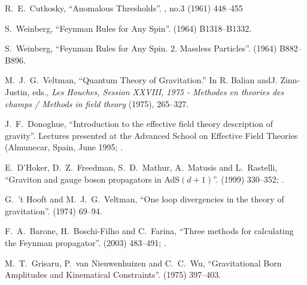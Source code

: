 \begin{thebibliography}{99}
R.~E.~Cutkosky,
``Anomalous Thresholds''.
 , no.3 (1961) 448--455\newline
{\tt{}}

S.~Weinberg,
``Feynman Rules for Any Spin''.
  (1964) B1318--B1332.\newline
{\tt{}}

S.~Weinberg,
``Feynman Rules for Any Spin. 2. Massless Particles''.
  (1964) B882--B896.\newline
{\tt{}}

M.~J.~G.~Veltman,
``Quantum Theory of Gravitation.''
In R. Balian andJ. Zinn-Justin, eds.,
\emph{Les Houches, Session XXVIII, 1975 - Methodes en theories des champs / Methods in field theory}
(1975), 265--327.

J.~F.~Donoghue,
``Introduction to the effective field theory description of gravity''.
Lectures presented at the Advanced School on Effective Field Theories
(Almunecar, Spain, June 1995; .

E.~D'Hoker, D.~Z.~Freedman, S.~D.~Mathur, A.~Matusis and L.~Rastelli,
``Graviton and gauge boson propagators in AdS$(d+1)$''.
  (1999) 330--352;
.\newline
{\tt{}}

G.~'t Hooft and M.~J.~G.~Veltman,
``One loop divergencies in the theory of gravitation''.
  (1974) 69--94.

F.~A.~Barone, H.~Boschi-Filho and C.~Farina,
``Three methods for calculating the Feynman propagator''.
  (2003) 483--491; .\newline
{\tt{}}

M.~T.~Grisaru, P.~van Nieuwenhuizen and C.~C.~Wu,
``Gravitational Born Amplitudes and Kinematical Constraints''.
  (1975) 397--403.\newline
{\tt{}}

\end{thebibliography}
